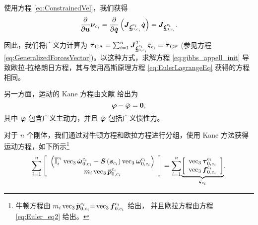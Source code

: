 使用方程 \eqref{eq:ConstrainedVel}，我们获得
\begin{equation}
\frac{\partial}{\partial\boldsymbol{u}}\boldsymbol{\nu}_{c_{i}}=\frac{\partial}{\partial\dot{\boldsymbol{q}}}\left(\boldsymbol{J}_{\underline{\boldsymbol{\xi}}_{0,c_{i}}^{c_{i}}}\dot{\boldsymbol{q}}\right)=\boldsymbol{J}_{\underline{\boldsymbol{\xi}}_{0,c_{i}}^{c_{i}}}.\label{eq:partial_velocities}
\end{equation}

因此，我们将广义力计算为 $\boldsymbol{\bar{\tau}}_{\mathrm{GA}}=\sum_{i=1}^{n}\boldsymbol{J}_{\underline{\boldsymbol{\xi}}_{0,c_{i}}^{c_{i}}}^{T}\boldsymbol{\bar{\varsigma}}_{c_{i}}=\boldsymbol{\bar{\tau}}_{\mathrm{GP}}$
(参见方程 \eqref{eq:GeneralizedForcesVector})。以这种方式，求解方程 \eqref{eq:gibbs_appell_init}
导致欧拉-拉格朗日方程，其与使用高斯原理方程 \eqref{eq:EulerLagrangeEq} 获得的方程相同。

另一方面，运动的 Kane 方程由文献 \cite{Kane1983Dynamics} 给出为
\begin{equation}
\boldsymbol{\varphi}-\bar{\boldsymbol{\varphi}}=\boldsymbol{0},\label{eq:Kane_equations}
\end{equation}
其中 $\boldsymbol{\varphi}$ 包含广义主动力，并且 $\bar{\boldsymbol{\varphi}}$ 包括广义惯性力。

对于 $n$ 个刚体，我们通过对牛顿方程和欧拉方程进行分组，使用 Kane 方法获得运动方程，如下所示\footnote{牛顿方程由 $m_{i}\operatorname{vec}_{3}\ddot{\boldsymbol{p}}_{0,c_{i}}^{c_{i}}{=}\operatorname{vec}_{3}\boldsymbol{f}_{0,c_{i}}^{c_{i}}$ 给出，
并且欧拉方程由方程 \eqref{eq:Euler_eq2} 给出。}
\begin{equation}
\underset{i=1}{\sum^{n}}\left[\begin{array}{c}
\left(\bar{\boldsymbol{\mathbb{I}}}_{i}^{c_{i}}\operatorname{vec}_{3}\dot{\boldsymbol{\omega}}_{0,c_{i}}^{c_{i}}-\boldsymbol{S}\left(\boldsymbol{s}_{c_{i}}\right)\operatorname{vec}_{3}\boldsymbol{\omega}_{0,c_{i}}^{c_{i}}\right)\\
m_{i}\operatorname{vec}_{3}\ddot{\boldsymbol{p}}_{0,c_{i}}^{c_{i}}
\end{array}\right]=\underset{i=1}{\sum^{n}}\underset{\boldsymbol{\bar{\varsigma}}_{c_{i}}}{\underbrace{\left[\begin{array}{c}
\operatorname{vec}_{3}\boldsymbol{\tau}_{0,c_{i}}^{c_{i}}\\
\operatorname{vec}_{3}\boldsymbol{f}_{0,c_{i}}^{c_{i}}
\end{array}\right]}}.\label{eq:FundamentalEquations-1}
\end{equation}

